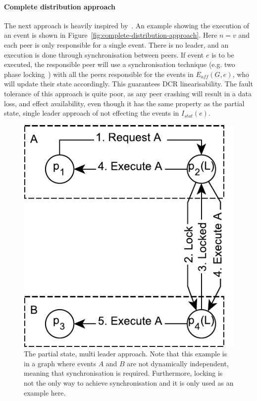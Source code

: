 \documentclass{article}
\begin{document}
	\paragraph{Complete distribution approach}
	The next approach is heavily inspired by~\cite{hildebrandt_safe_2011}.
    An example showing the execution of an event is shown in Figure~\ref{fig:complete-distribution-approach}.
	Here $n = v$ and each peer is only responsible for a single event.
	There is no leader, and an execution is done through synchronisation between peers.
	If event $e$ is to be executed, the responsible peer will use a synchronisation technique (e.g. two phase locking~\cite{skeen_nonblocking_1981}) with all the peers responsible for the events in $E_{aff}(G,e)$, who will update their state accordingly.
	This guarantees DCR linearisability.
	The fault tolerance of this approach is quite poor, as any peer crashing will result in a data loss, and effect availability, even though it has the same property as the partial state, single leader approach of not effecting the events in $I_{stat}(e)$.

    \begin{figure}[ht]
        \center
        \includegraphics[scale=0.6]{figures/dcr-graphs/partial-state-multi-leader-approach.pdf}
        \caption{The partial state, multi leader approach.
        Note that this example is in a graph where events $A$ and $B$ are not dynamically independent, meaning that synchronisation is required.
        Furthermore, locking is not the only way to achieve synchronisation and it is only used as an example here. }
        \label{fig:partial-state-multi-leader-approach}
    \end{figure}
    \FloatBarrier
\end{document}
